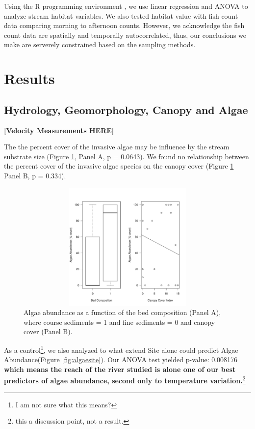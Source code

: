 \documentclass{article}\usepackage[]{graphicx}\usepackage[]{color}
\newenvironment{knitrout}{}{} %
\begin{document}
Using the R programming environment \citep{CRAN}, we use linear regression and ANOVA to analyze stream habitat variables. We also tested habitat value with fish count data comparing morning to afternoon counts. However, we acknowledge the fish count data are spatially and temporally autocorrelated, thus, our conclusions we make are serverely constrained based on the sampling methods.

\section{Results}



\subsection{Hydrology, Geomorphology, Canopy and Algae}

\textbf{[Velocity Measurements HERE]}

The the percent cover of the invasive algae may be influence by the stream substrate size (Figure \ref{fig:algae}, Panel A, p = 0.0643). We found no relationship between the percent cover of the invasive algae species on the canopy cover (Figure \ref{fig:algae} Panel B, p = 0.334).

\begin{figure}[!ht]
\begin{knitrout}
\color{fgcolor}
\includegraphics[width=5in,height=2.5in]{figure/unnamed-chunk-2-1} 

\end{knitrout}
\caption{Algae abundance as a function of the bed composition (Panel A), where course sediments = 1 and fine sediments = 0 and canopy cover (Panel B).}
\label{fig:algae}
\end{figure}

As a control\footnote{I am not sure what this means?}, we also analyzed to what extend Site alone could predict Algae Abundance(Figure \ref{fig:algaesite}). Our ANOVA test yielded p-value: 0.008176 \textbf{which means the reach of the river studied is alone one of our best predictors of algae abundance, second only to temperature variation.}\footnote{this a discussion point, not a result.} 
\end{document}
